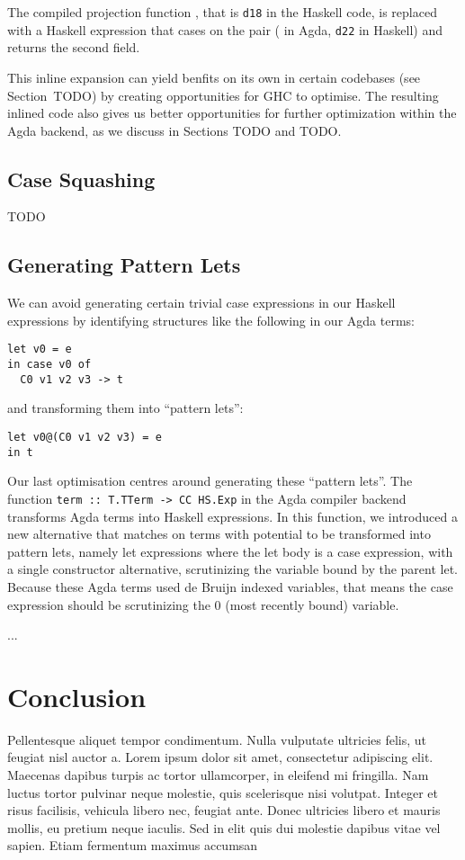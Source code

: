 The compiled projection function , that is \lstinline{d18} in the Haskell code, is replaced with a Haskell expression that cases on the pair ( in Agda, \lstinline{d22} in Haskell) and returns the second field.

This inline expansion can yield benfits on its own in certain codebases (see Section~TODO) by creating opportunities for GHC to optimise. The resulting inlined code also gives us better opportunities for further optimization within the Agda backend, as we discuss in Sections TODO and TODO.

\subsection{Case Squashing}

TODO

\subsection{Generating Pattern Lets}

We can avoid generating certain trivial case expressions in our Haskell expressions by identifying structures like the following in our Agda terms:

\begin{lstlisting}
let v0 = e
in case v0 of
  C0 v1 v2 v3 -> t
\end{lstlisting}

and transforming them into ``pattern lets'':

\begin{lstlisting}
let v0@(C0 v1 v2 v3) = e
in t
\end{lstlisting}

Our last optimisation centres around generating these ``pattern lets''. The function \lstinline{term :: T.TTerm -> CC HS.Exp} in the Agda compiler backend transforms Agda terms into Haskell expressions. In this function, we introduced a new alternative that matches on terms with potential to be transformed into pattern lets, namely let expressions where the let body is a case expression, with a single constructor alternative, scrutinizing the variable bound by the parent let. Because these Agda terms used de Bruijn indexed variables, that means the case expression should be scrutinizing the 0 (most recently bound) variable.

...

\section{Conclusion}
\label{sec:main_conclusion}

Pellentesque aliquet tempor condimentum. Nulla vulputate ultricies felis, ut feugiat nisl auctor a. Lorem ipsum dolor sit amet, consectetur adipiscing elit. Maecenas dapibus turpis ac tortor ullamcorper, in eleifend mi fringilla. Nam luctus tortor pulvinar neque molestie, quis scelerisque nisi volutpat. Integer et risus facilisis, vehicula libero nec, feugiat ante. Donec ultricies libero et mauris mollis, eu pretium neque iaculis. Sed in elit quis dui molestie dapibus vitae vel sapien. Etiam fermentum maximus accumsan

